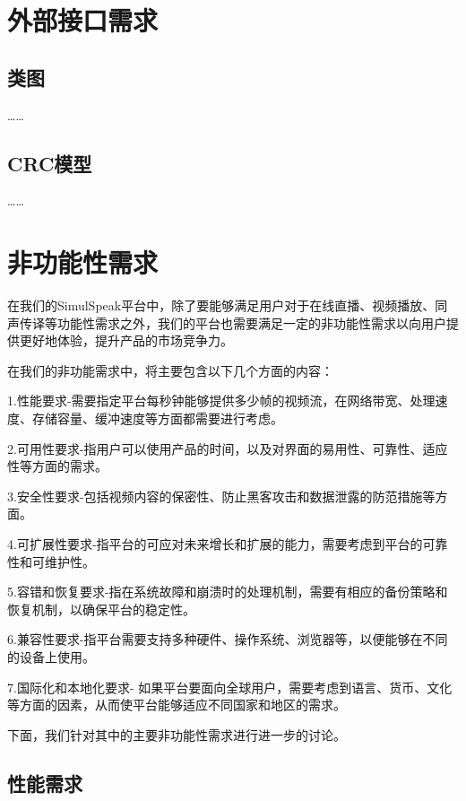 \newpage


\chapter{外部接口需求}
\label{ch:outer-interface}

\section{类图}

……

\section{CRC模型}

……


\newpage


\chapter{非功能性需求}
\label{ch:nonfunctional}

在我们的SimulSpeak平台中，除了要能够满足用户对于在线直播、视频播放、同声传译等功能性需求之外，我们的平台也需要满足一定的非功能性需求以向用户提供更好地体验，提升产品的市场竞争力。

在我们的非功能需求中，将主要包含以下几个方面的内容：

1.性能要求-需要指定平台每秒钟能够提供多少帧的视频流，在网络带宽、处理速度、存储容量、缓冲速度等方面都需要进行考虑。

2.可用性要求-指用户可以使用产品的时间，以及对界面的易用性、可靠性、适应性等方面的需求。

3.安全性要求-包括视频内容的保密性、防止黑客攻击和数据泄露的防范措施等方面。

4.可扩展性要求-指平台的可应对未来增长和扩展的能力，需要考虑到平台的可靠性和可维护性。

5.容错和恢复要求-指在系统故障和崩溃时的处理机制，需要有相应的备份策略和恢复机制，以确保平台的稳定性。

6.兼容性要求-指平台需要支持多种硬件、操作系统、浏览器等，以便能够在不同的设备上使用。

7.国际化和本地化要求- 如果平台要面向全球用户，需要考虑到语言、货币、文化等方面的因素，从而使平台能够适应不同国家和地区的需求。

下面，我们针对其中的主要非功能性需求进行进一步的讨论。

\section{性能需求}

